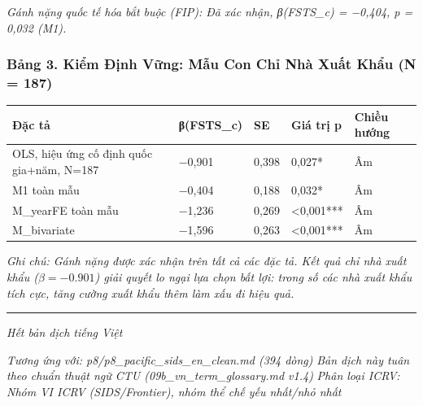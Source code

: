 \documentclass[12pt,a4paper]{article}
\begin{document}
\emph{Gánh nặng quốc tế hóa bắt buộc (FIP): Đã xác nhận, β(FSTS\_c) =
−0,404, p = 0,032 (M1).}

\hypertarget{bux1ea3ng-3-kiux1ec3m-ux111ux1ecbnh-vux1eefng-mux1eabu-con-chux1ec9-nhuxe0-xuux1ea5t-khux1ea9u-n--187}{%
\subsubsection{Bảng 3. Kiểm Định Vững: Mẫu Con Chỉ Nhà Xuất Khẩu (N =
187)}\label{bux1ea3ng-3-kiux1ec3m-ux111ux1ecbnh-vux1eefng-mux1eabu-con-chux1ec9-nhuxe0-xuux1ea5t-khux1ea9u-n--187}}

\begin{longtable}[]{@{}lllll@{}}
\toprule\noalign{}
Đặc tả & β(FSTS\_c) & SE & Giá trị p & Chiều hướng \\
\midrule\noalign{}
\endhead
\bottomrule\noalign{}
\endlastfoot
OLS, hiệu ứng cố định quốc gia+năm, N=187 & −0,901 & 0,398 & 0,027* &
Âm \\
M1 toàn mẫu & −0,404 & 0,188 & 0,032* & Âm \\
M\_yearFE toàn mẫu & −1,236 & 0,269 & \textless0,001*** & Âm \\
M\_bivariate & −1,596 & 0,263 & \textless0,001*** & Âm \\
\end{longtable}

\emph{Ghi chú: Gánh nặng được xác nhận trên tất cả các đặc tả. Kết quả
chỉ nhà xuất khẩu (\(\beta = −0.901\)) giải quyết lo ngại lựa chọn bất
lợi: trong số các nhà xuất khẩu tích cực, tăng cường xuất khẩu thêm làm
xấu đi hiệu quả.}

\begin{center}\rule{0.5\linewidth}{0.5pt}\end{center}

\emph{Hết bản dịch tiếng Việt}

\emph{Tương ứng với: p8/p8\_pacific\_sids\_en\_clean.md (394 dòng)}
\emph{Bản dịch này tuân theo chuẩn thuật ngữ CTU
(09b\_vn\_term\_glossary.md v1.4)} \emph{Phân loại ICRV: Nhóm VI ICRV
(SIDS/Frontier), nhóm thể chế yếu nhất/nhỏ nhất}
\end{document}

